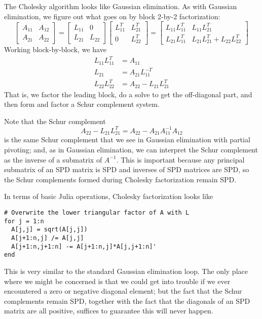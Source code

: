 \documentclass[12pt, leqno]{article}
\begin{document}
The Cholesky algorithm looks like Gaussian elimination.  As
with Gaussian elimination, we figure out what goes on
by block 2-by-2 factorization:
\[
\begin{bmatrix} A_{11} & A_{12} \\ A_{21} & A_{22} \end{bmatrix} =
\begin{bmatrix} L_{11} & 0 \\ L_{21} & L_{22} \end{bmatrix}
\begin{bmatrix} L_{11}^T & L_{21}^T \\ 0 & L_{22}^T \end{bmatrix} =
\begin{bmatrix}
  L_{11} L_{11}^T & L_{11} L_{21}^T \\
  L_{21} L_{11}^T & L_{21} L_{21}^T+ L_{22} L_{22}^T
\end{bmatrix}
\]
Working block-by-block, we have
\begin{align*}
  L_{11} L_{11}^T &= A_{11} \\
  L_{21} &= A_{21} L_{11}^{-T} \\
  L_{22} L_{22}^T &= A_{22} - L_{21} L_{21}^T
\end{align*}
That is, we factor the leading block, do a solve to get the
off-diagonal part, and then form and factor a Schur complement
system.

Note that the Schur complement
\[
  A_{22}-L_{21} L_{21}^T = A_{22} - A_{21} A_{11}^{-1} A_{12}
\]
is the same Schur complement that we see in Gaussian elimination
with partial pivoting; and, as in Gaussian elimination, we can
interpret the Schur complement as the inverse of a submatrix
of $A^{-1}$.  This is important because any principal submatrix of
an SPD matrix is SPD and inverses of SPD matrices are SPD, so
the Schur complements formed during Cholesky factorization remain
SPD.

In terms of basic Julia operations, Cholesky factorization looks like
\begin{lstlisting}
# Overwrite the lower triangular factor of A with L
for j = 1:n
  A[j,j] = sqrt(A[j,j])
  A[j+1:n,j] /= A[j,j]
  A[j+1:n,j+1:n] -= A[j+1:n,j]*A[j,j+1:n]'
end
\end{lstlisting}
This is very similar to the standard Gaussian elimination loop.
The only place where we might be concerned is that we could get
into trouble if we ever encountered a zero or negative diagonal
element; but the fact that the Schur complements remain SPD, together
with the fact that the diagonals of an SPD matrix are all positive,
suffices to guarantee this will never happen.
\end{document}
